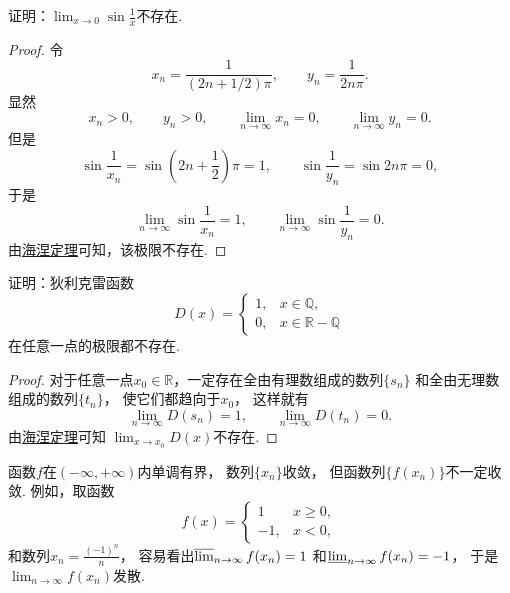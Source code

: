 \begin{example}
证明：\(\lim_{x\to0} \sin\frac1x\)不存在.
\begin{proof}
令\begin{equation*}
	x_n = \frac1{(2n+1/2)\pi},
	\qquad
	y_n = \frac1{2n\pi}.
\end{equation*}
显然\begin{equation*}
	x_n>0,
	\qquad
	y_n>0,
	\qquad
	\lim_{n\to\infty} x_n = 0,
	\qquad
	\lim_{n\to\infty} y_n = 0.
\end{equation*}
但是\begin{equation*}
	\sin\frac1{x_n}
	= \sin\left(2n+\frac12\right)\pi
	= 1,
	\qquad
	\sin\frac1{y_n}
	= \sin 2n\pi
	= 0,
\end{equation*}
于是\begin{equation*}
	\lim_{n\to\infty} \sin\frac1{x_n} = 1,
	\qquad
	\lim_{n\to\infty} \sin\frac1{y_n} = 0.
\end{equation*}
由\hyperref[theorem:极限.海涅定理]{海涅定理}可知，该极限不存在.
\end{proof}
\end{example}
\begin{example}\label{example:海涅定理.狄利克雷函数在任意一点的极限都不存在}
证明：狄利克雷函数\begin{equation*}
	D(x) = \left\{ \begin{array}{ll}
		1, & x \in \mathbb{Q}, \\
		0, & x \in \mathbb{R}-\mathbb{Q}
	\end{array} \right.
\end{equation*}在任意一点的极限都不存在.
\begin{proof}
对于任意一点\(x_0\in\mathbb{R}\)，一定存在全由有理数组成的数列\(\{s_n\}\)
和全由无理数组成的数列\(\{t_n\}\)，
使它们都趋向于\(x_0\)，
这样就有\begin{equation*}
	\lim_{n\to\infty} D(s_n) = 1,
	\qquad
	\lim_{n\to\infty} D(t_n) = 0.
\end{equation*}
由\hyperref[theorem:极限.海涅定理]{海涅定理}可知
\(\lim_{x \to x_0} D(x)\)不存在.
\end{proof}
\end{example}

\begin{example}
函数\(f\)在\((-\infty,+\infty)\)内单调有界，
数列\(\{x_n\}\)收敛，
但函数列\(\{f(x_n)\}\)不一定收敛.
例如，取函数\begin{equation*}
	f(x) = \left\{ \begin{array}{rl}
		1 & x\geq0, \\
		-1, & x<0,
	\end{array} \right.
\end{equation*}
和数列\(x_n = \frac{(-1)^n}{n}\)，
容易看出\(\varlimsup_{n\to\infty} f(x_n) = 1\)
和\(\varliminf_{n\to\infty} f(x_n) = -1\)，
于是\(\lim_{n\to\infty} f(x_n)\)发散.
\end{example}

